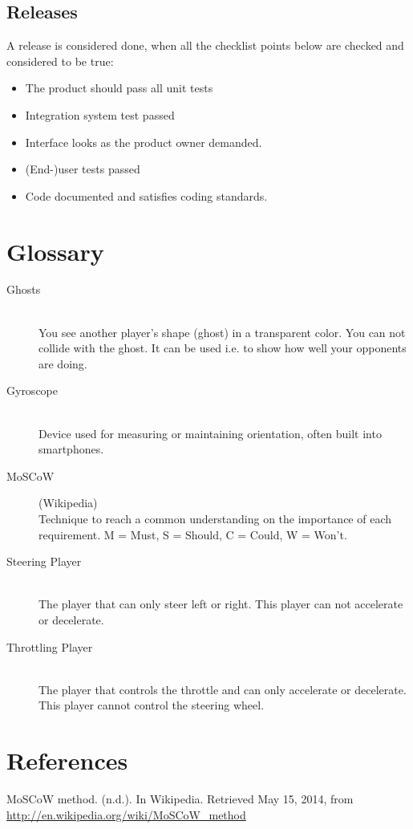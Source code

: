 \documentclass[11pt,twoside,a4paper]{article}
\begin{document}
\subsection{Releases}
A release is considered done, when all the checklist points below are checked and considered to be true:
\begin{itemize}
	\item The product should pass all unit tests
	\item Integration system test passed
	\item Interface looks as the product owner demanded.
	\item (End-)user tests passed
	\item Code documented and satisfies coding standards.
\end{itemize}
\newpage
\section{Glossary}
\begin{description}
\item[Ghosts] \hfill \\
You see another player's shape (ghost) in a transparent color. You can not collide with the ghost. It can be used i.e. to show how well your opponents are doing.
\item[Gyroscope] \hfill \\
Device used for measuring or maintaining orientation, often built into smartphones.
\item[MoSCoW] (Wikipedia) \hfill \\
Technique to reach a common understanding on the importance of each requirement. M = Must, S = Should, C = Could, W = Won't.
\item[Steering Player] \hfill \\
The player that can only steer left or right. This player can not accelerate or decelerate.
\item[Throttling Player] \hfill \\
The player that controls the throttle and can only accelerate or decelerate. This player cannot control the steering wheel.

\end{description}

\section*{References}
MoSCoW method. (n.d.). In Wikipedia. Retrieved May 15, 2014, from \url{http://en.wikipedia.org/wiki/MoSCoW_method}
\end{document}
